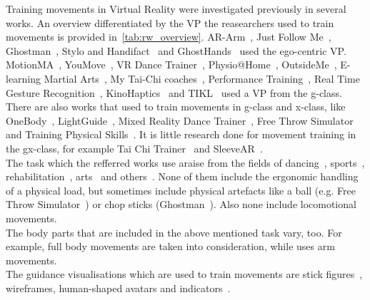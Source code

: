 Training movements in Virtual Reality were investigated previously in several works. An overview differentiated by the VP the reasearchers used to train movements is provided in~\ref{tab:rw_overview}. AR-Arm~\cite{ararm}, Just Follow Me~\cite{justfollowme}, Ghostman~\cite{ghostman}, Stylo and Handifact~\cite{stylo} and GhostHands~\cite{ghosthands} used the ego-centric VP. MotionMA~\cite{motionma}, YouMove~\cite{YouMove}, VR Dance Trainer~\cite{vrdancetrainer}, Physio@Home~\cite{physioathome}, OutsideMe~\cite{outsideme}, E-learning Martial Arts~\cite{elearningma}, My Tai-Chi coaches~\cite{mythaichicoaches}, Performance Training~\cite{performancetraining}, Real Time Gesture Recognition~\cite{rtgesturerecognistion}, KinoHaptics~\cite{kinohaptics} and TIKL~\cite{tikl} used a VP from the g-class. There are also works that used to train movements in g-class and x-class, like OneBody~\cite{onebody}, LightGuide~\cite{lightguide}, Mixed Reality Dance Trainer~\cite{mrdancetrainer}, Free Throw Simulator~\cite{freethrowsimulator} and Training Physical Skills~\cite{trainingphysicalskills}. It is little research done for movement training in the gx-class, for example Tai Chi Trainer~\cite{thaichichua} and SleeveAR~\cite{sleevear}.\\
The task which the refferred works use araise from the fields of dancing~\cite{YouMove,vrdancetrainer,outsideme,performancetraining,mrdancetrainer}, sports~\cite{freethrowsimulator,trainingphysicalskills}, rehabilitation~\cite{motionma,physioathome,kinohaptics,sleevear,veimprovesml}, arts~\cite{ararm,justfollowme,stylo,elearningma,mythaichicoaches,rtgesturerecognistion,onebody,thaichichua} and others~\cite{tikl,lightguide}. None of them include the ergonomic handling of a physical load, but sometimes include physical artefacts like a ball (e.g. Free Throw Simulator~\cite{}) or chop sticks (Ghostman~\cite{ghostman}). Also none include locomotional movements.\\
The body parts that are included in the above mentioned task vary, too. For example, \cite{YouMove, thaichichua,onebody,vrdancetrainer} full body movements are taken into consideration, while \cite{ararm,sleevear,ghosthands} uses arm movements.\\
The guidance visualisations which are used to train movements are stick figures~\cite{onebody,YouMove,vrdancetrainer,performancetraining}, wireframes\cite{thaichichua,mrdancetrainer}, human-shaped avatars\cite{thaichichua,vrdancetrainer,trainingphysicalskills,mythaichicoaches} and indicators~\cite{ararm,physioathome,sleevear,ghostman}.\\

